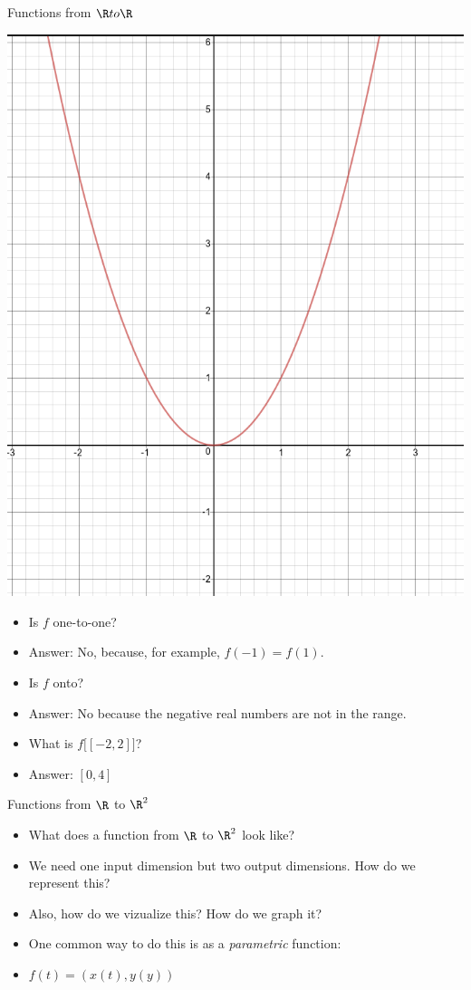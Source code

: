 \documentclass{beamer}
\begin{document}
\begin{frame}{Functions from $\R to \R$}

\includegraphics[scale=0.1]{parabola}

\begin{itemize}
\item Is $f$ one-to-one?
\item Answer: No, because, for example, $f(-1) = f(1)$.
\item Is $f$ onto?
\item Answer: No because the negative real numbers are not in the range.
\item What is $f\big[ [-2,2] \big]$?
\item Answer: $[0, 4]$
\end{itemize}

\end{frame}

\begin{frame}{Functions from $\R$ to $\R^2$}

\begin{itemize}
\item What does a function from $\R$ to $\R^2$ look like?
\item We need one input dimension but two output dimensions.
How do we represent this?
\item Also, how do we vizualize this? How do we graph it?
\item One common way to do this is as a \emph{parametric} function:
\item $f(t) = (x(t), y(y))$
\end{itemize}

\end{frame}
\end{document}
